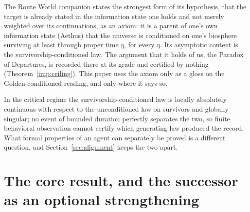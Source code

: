 \begin{definition}\label{imp:goldenaxiom}
The Route World companion states the strongest form of its hypothesis,
that the target is already stated in the information state one holds
and not merely weighted over its continuations, as an axiom: it is a
parent of one's own information state (Aethus) that the universe is
conditioned on one's biosphere surviving at least through proper time
$\eta$, for every $\eta$. Its asymptotic content is the
survivorship-conditioned law. The argument that it holds of
us, the Paradox of Departures, is recorded there at its grade and
certified by nothing (Theorem~\ref{imp:ceiling}). This paper uses the
axiom only as a gloss on the Golden-conditioned reading, and only where
it says so.
\end{definition}

\begin{theorem}\label{imp:ceiling}
In the critical regime the survivorship-conditioned law is locally
absolutely continuous with respect to the unconditioned law on
survivors and globally singular; no event of bounded duration perfectly
separates the two, so finite behavioral observation cannot certify
which generating law produced the record. What formal properties of an
agent can separately be proved is a different question, and
Section~\ref{sec:alignment} keeps the two apart.
\end{theorem}

\section{The core result, and the successor as an optional strengthening}\label{sec:core}

